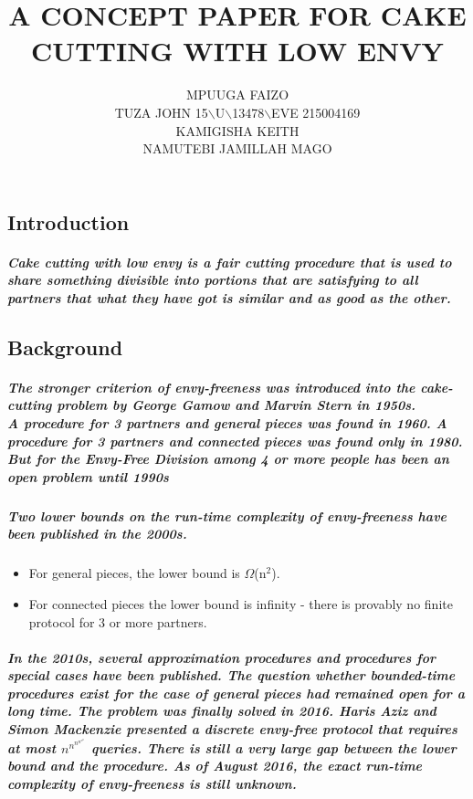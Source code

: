 \documentclass[12pt]{report}
\title{\textbf{A CONCEPT PAPER FOR CAKE CUTTING WITH LOW ENVY}}
\author{MPUUGA FAIZO\\ TUZA JOHN 15$\backslash$U$\backslash$13478$\backslash$EVE 215004169\\ KAMIGISHA KEITH \\ NAMUTEBI JAMILLAH MAGO}
\begin{document}
\maketitle
\chapter{}
\section{Introduction} 
\paragraph{Cake cutting with low envy is a fair cutting procedure that is used to share something divisible into portions that are satisfying to all partners that what they have got is similar and as good as the other. }


\section{Background}
\paragraph{The stronger criterion of envy-freeness was introduced into the cake-cutting problem by George Gamow and Marvin Stern in 1950s.\\
	A procedure for 3 partners and general pieces was found in 1960. A procedure for 3 partners and connected pieces was found only in 1980.\\
	But for the Envy-Free Division among 4 or more people has been an open problem until 1990s}
\paragraph{Two lower bounds on the run-time complexity of envy-freeness have been published in the 2000s.}
\begin{itemize}
	\item For general pieces, the lower bound is $\Omega$(n$^{2}$).
	\item For connected pieces the lower bound is infinity - there is provably no finite protocol for 3 or more partners.
\end{itemize}
\paragraph{In the 2010s, several approximation procedures and procedures for special cases have been published. The question whether bounded-time procedures exist for the case of general pieces had remained open for a long time. The problem was finally solved in 2016. Haris Aziz and Simon Mackenzie presented a discrete envy-free protocol that requires \\
	at most ${\displaystyle n^{n^{n^{n^{n^{n}}}}}}$ queries. There is still a very large gap between the lower bound and the procedure. As of August 2016, the exact run-time complexity of envy-freeness is still unknown. }
\end{document}
